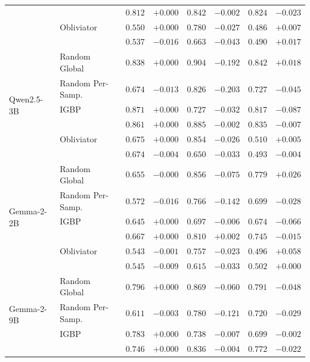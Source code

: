 \begin{longtable}{ll|rr|rr|rr}
   & \AmbGCE{} & $0.812$ & $+0.000$ & $0.842$ & $\boldsymbol{-0.002}$ & $0.824$ & $\boldsymbol{-0.023}$ \\
   & Obliviator & $0.550$ & $+0.000$ & $0.780$ & $-0.027$ & $\boldsymbol{0.486}$ & $+0.007$ \\
   & \TanGCE{} & $\boldsymbol{0.537}$ & $-0.016$ & $\boldsymbol{0.663}$ & $-0.043$ & $0.490$ & $+0.017$ \\
  \midrule
  \multirow{6}{*}{Qwen2.5-3B} & Random Global & $0.838$ & $+0.000$ & $0.904$ & $-0.192$ & $0.842$ & $+0.018$ \\
   & Random Per-Samp. & $0.674$ & $-0.013$ & $0.826$ & $-0.203$ & $0.727$ & $-0.045$ \\
   & IGBP & $0.871$ & $\boldsymbol{+0.000}$ & $0.727$ & $-0.032$ & $0.817$ & $-0.087$ \\
   & \AmbGCE{} & $0.861$ & $+0.000$ & $0.885$ & $\boldsymbol{-0.002}$ & $0.835$ & $\boldsymbol{-0.007}$ \\
   & Obliviator & $0.675$ & $+0.000$ & $0.854$ & $-0.026$ & $0.510$ & $+0.005$ \\
   & \TanGCE{} & $\boldsymbol{0.674}$ & $-0.004$ & $\boldsymbol{0.650}$ & $-0.033$ & $\boldsymbol{0.493}$ & $-0.004$ \\
  \midrule
  \multirow{6}{*}{Gemma-2-2B} & Random Global & $0.655$ & $-0.000$ & $0.856$ & $-0.075$ & $0.779$ & $+0.026$ \\
   & Random Per-Samp. & $0.572$ & $-0.016$ & $0.766$ & $-0.142$ & $0.699$ & $-0.028$ \\
   & IGBP & $0.645$ & $\boldsymbol{+0.000}$ & $0.697$ & $-0.006$ & $0.674$ & $-0.066$ \\
   & \AmbGCE{} & $0.667$ & $+0.000$ & $0.810$ & $\boldsymbol{+0.002}$ & $0.745$ & $-0.015$ \\
   & Obliviator & $\boldsymbol{0.543}$ & $-0.001$ & $0.757$ & $-0.023$ & $\boldsymbol{0.496}$ & $+0.058$ \\
   & \TanGCE{} & $0.545$ & $-0.009$ & $\boldsymbol{0.615}$ & $-0.033$ & $0.502$ & $+0.000$ \\
  \midrule
  \multirow{6}{*}{Gemma-2-9B} & Random Global & $0.796$ & $+0.000$ & $0.869$ & $-0.060$ & $0.791$ & $-0.048$ \\
   & Random Per-Samp. & $0.611$ & $-0.003$ & $0.780$ & $-0.121$ & $0.720$ & $-0.029$ \\
   & IGBP & $0.783$ & $\boldsymbol{+0.000}$ & $0.738$ & $-0.007$ & $0.699$ & $-0.002$ \\
   & \AmbGCE{} & $0.746$ & $+0.000$ & $0.836$ & $\boldsymbol{-0.004}$ & $0.772$ & $-0.022$ \\

\end{longtable}
